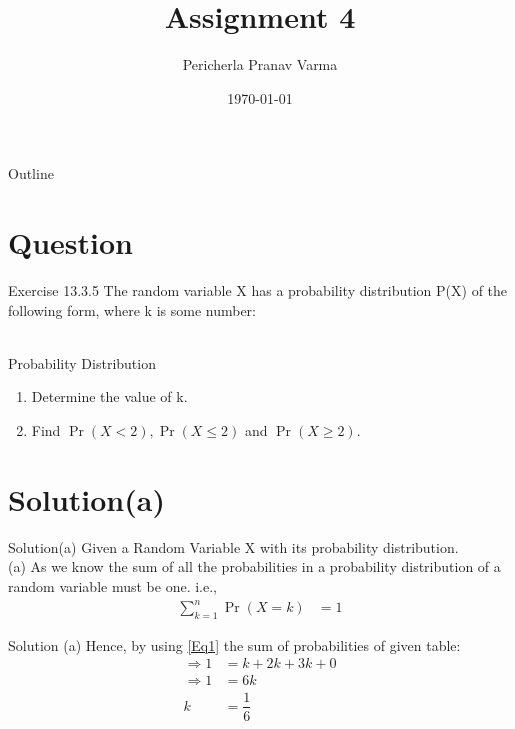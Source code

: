 \documentclass{beamer}
\title{Assignment 4}
\author{Pericherla Pranav Varma}
\date{\today}
\providecommand{\pr}[1]{\ensuremath{\Pr\left(#1\right)}}
\begin{document}
    \begin{frame}
        \titlepage 
    \end{frame}

    \begin{frame}{Outline}
        \tableofcontents
    \end{frame}

    \section{Question}
    	\begin{frame}{Exercise 13.3.5}
    The random variable X has a probability distribution P(X) of the following form, where k is some number:\\[6pt]
    
   \begin{table}[H]
			\def\arraystretch{1.5}    		
    		\centering
				\\[6pt]
    		\caption{Probability Distribution}
    			\label{Table 1}
	\end{table}
    \begin{enumerate}[label=(\alph{enumi})]
    		\item Determine the value of k.
    		\item Find $\pr{X<2},\pr{X \le 2}$ and $\pr{X \ge 2}$.
    \end{enumerate} 
    	\end{frame}
    \section{Solution(a)}
        \begin{frame}{Solution(a)}
        Given a Random Variable X with its probability distribution.\\[9pt]
        (a) As we know the sum of all the probabilities in a probability distribution of a random variable must be one. i.e.,\\
	\begin{align}
		\sum^{n}_{k=1} \pr{X=k} &= 1 
        \label{Eq1}
        \end{align}
    \end{frame}
    \begin{frame}{Solution (a)}
    Hence, by using \eqref{Eq1} the sum of probabilities of given table:
    \begin{align*}
    \Longrightarrow 1 &= k+2k+3k+0 \\
    \Longrightarrow 1 &= 6k\\
    k &= \dfrac{1}{6}
    \end{align*}
    \end{frame}
\end{document}
